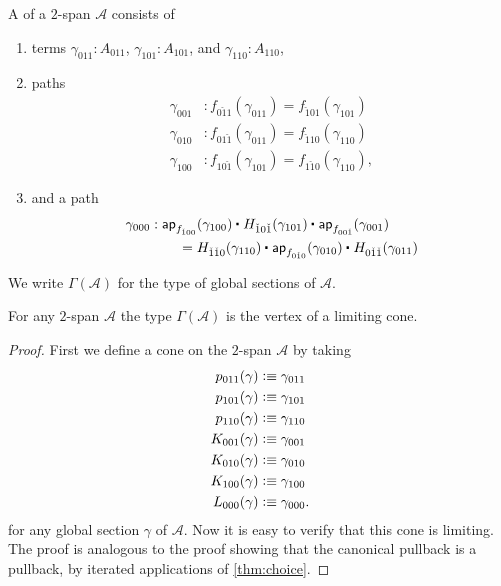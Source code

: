\begin{defn}
A  of a $2$-span $\mathcal{A}$ consists of
\begin{enumerate}
\item terms $\gamma_{011}:A_{011}$, $\gamma_{101}:A_{101}$, and $\gamma_{110}:A_{110}$,
\item paths
\begin{align*}
\gamma_{001} & : f_{0\check{1}1}(\gamma_{011}) = f_{\check{1}01}(\gamma_{101}) \\
\gamma_{010} & : f_{01\check{1}}(\gamma_{011}) = f_{\check{1}10}(\gamma_{110}) \\
\gamma_{100} & : f_{10\check{1}}(\gamma_{101}) = f_{1\check{1}0}(\gamma_{110}),
\end{align*}
\item and a path
\begin{align*}
\gamma_{000} & : \ct{\mathsf{ap}_{f_{\check{1}00}}(\gamma_{100})}{H_{\check{1}0\check{1}}(\gamma_{101})}{\mathsf{ap}_{f_{00\check{1}}}(\gamma_{001})} \\
& \qquad = \ct{H_{\check{1}\check{1}0}(\gamma_{110})}{\mathsf{ap}_{f_{0\check{1}0}}(\gamma_{010})}{H_{0\check{1}\check{1}}(\gamma_{011})}
\end{align*}
\end{enumerate}
We write $\Gamma(\mathcal{A})$ for the type of global sections of $\mathcal{A}$.
\end{defn}

\begin{prp}
For any $2$-span $\mathcal{A}$ the type $\Gamma(\mathcal{A})$ is the vertex of a limiting cone.
\end{prp}

\begin{proof}
First we define a cone on the $2$-span $\mathcal{A}$ by taking
\begin{align*}
p_{011}(\gamma) & \vcentcolon\equiv \gamma_{011} \\
p_{101}(\gamma) & \vcentcolon\equiv \gamma_{101} \\
p_{110}(\gamma) & \vcentcolon\equiv \gamma_{110} \\
K_{001}(\gamma) & \vcentcolon\equiv \gamma_{001} \\
K_{010}(\gamma) & \vcentcolon\equiv \gamma_{010} \\
K_{100}(\gamma) & \vcentcolon\equiv \gamma_{100} \\
L_{000}(\gamma) & \vcentcolon\equiv \gamma_{000}.
\end{align*}
for any global section $\gamma$ of $\mathcal{A}$. Now it is easy to verify that this cone is limiting. The proof is analogous to the proof showing that the canonical pullback is a pullback, by iterated applications of \cref{thm:choice}. 
\end{proof}

